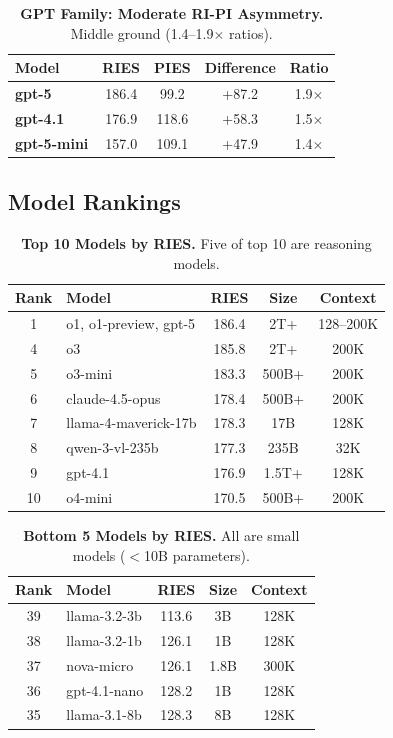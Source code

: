 \documentclass{article}
\begin{document}
\begin{table}[t]
\centering
\small
\caption{\textbf{GPT Family: Moderate RI-PI Asymmetry.} Middle ground (1.4--1.9$\times$ ratios).}
\label{tab:gpt_appendix}
\begin{tabular}{lcccc}
\toprule
Model & RIES & PIES & Difference & Ratio \\
\midrule
\textbf{gpt-5} & 186.4 & 99.2 & +87.2 & 1.9$\times$ \\
\textbf{gpt-4.1} & 176.9 & 118.6 & +58.3 & 1.5$\times$ \\
\textbf{gpt-5-mini} & 157.0 & 109.1 & +47.9 & 1.4$\times$ \\
\bottomrule
\end{tabular}
\end{table}

\subsection{Model Rankings}

\begin{table}[t]
\centering
\small
\caption{\textbf{Top 10 Models by RIES.} Five of top 10 are reasoning models.}
\label{tab:top10_appendix}
\begin{tabular}{clccc}
\toprule
Rank & Model & RIES & Size & Context \\
\midrule
1 & o1, o1-preview, gpt-5 & 186.4 & 2T+ & 128--200K \\
4 & o3 & 185.8 & 2T+ & 200K \\
5 & o3-mini & 183.3 & 500B+ & 200K \\
6 & claude-4.5-opus & 178.4 & 500B+ & 200K \\
7 & llama-4-maverick-17b & 178.3 & 17B & 128K \\
8 & qwen-3-vl-235b & 177.3 & 235B & 32K \\
9 & gpt-4.1 & 176.9 & 1.5T+ & 128K \\
10 & o4-mini & 170.5 & 500B+ & 200K \\
\bottomrule
\end{tabular}
\end{table}

\begin{table}[t]
\centering
\small
\caption{\textbf{Bottom 5 Models by RIES.} All are small models ($<$10B parameters).}
\label{tab:bottom5_appendix}
\begin{tabular}{clccc}
\toprule
Rank & Model & RIES & Size & Context \\
\midrule
39 & llama-3.2-3b & 113.6 & 3B & 128K \\
38 & llama-3.2-1b & 126.1 & 1B & 128K \\
37 & nova-micro & 126.1 & 1.8B & 300K \\
36 & gpt-4.1-nano & 128.2 & 1B & 128K \\
35 & llama-3.1-8b & 128.3 & 8B & 128K \\
\bottomrule
\end{tabular}
\end{table}
\end{document}
